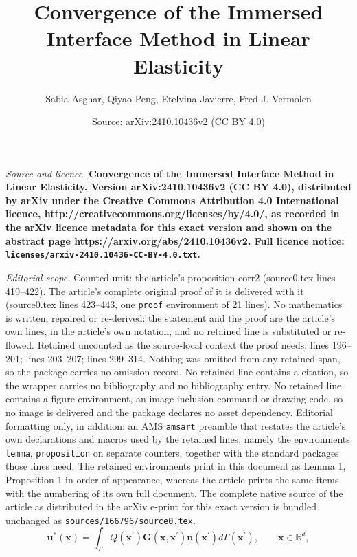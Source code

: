 \documentclass[10pt,a4paper]{amsart}
\title{\bf Convergence of the Immersed Interface Method in Linear Elasticity}
\author{Sabia Asghar, Qiyao Peng, Etelvina Javierre, Fred J. Vermolen}
\date{Source: arXiv:2410.10436v2 (CC BY 4.0)}
\begin{document}
\maketitle

\noindent\emph{Source and licence.} \bf Convergence of the Immersed Interface Method in Linear Elasticity. Version arXiv:2410.10436v2 (CC BY 4.0), distributed by arXiv under the Creative Commons Attribution 4.0 International licence, http://creativecommons.org/licenses/by/4.0/, as recorded in the arXiv licence metadata for this exact version and shown on the abstract page https://arxiv.org/abs/2410.10436v2. Full licence notice: \texttt{licenses/arxiv-2410.10436-CC-BY-4.0.txt}.\par\smallskip

\noindent\textit{Editorial scope.} Counted unit: the article's proposition corr2 (source0.tex lines 419--422). The article's complete original proof of it is delivered with it (source0.tex lines 423--443, one \texttt{proof} environment of 21 lines). No mathematics is written, repaired or re-derived: the statement and the proof are the article's own lines, in the article's own notation, and no retained line is substituted or re-flowed.  Retained uncounted as the source-local context the proof needs: lines 196--201; lines 203--207; lines 299--314.  Nothing was omitted from any retained span, so the package carries no omission record.  No retained line contains a citation, so the wrapper carries no bibliography and no bibliography entry.  No retained line contains a figure environment, an image-inclusion command or drawing code, so no image is delivered and the package declares no asset dependency.  Editorial formatting only, in addition: an AMS \texttt{amsart} preamble that restates the article's own declarations and macros used by the retained lines, namely the environments \texttt{lemma}, \texttt{proposition} on separate counters, together with the standard packages those lines need.  The retained environments print in this document as Lemma 1, Proposition 1 in order of appearance, whereas the article prints the same items with the numbering of its own full document.  The complete native source of the article as distributed in the arXiv e-print for this exact version is bundled unchanged as \texttt{sources/166796/source0.tex}.
\begin{equation}
\boldsymbol{u}^{\ast }(\boldsymbol{x})=\int_{\Gamma }Q(\boldsymbol{x}%
^{\prime })\boldsymbol{G}(\boldsymbol{x},\boldsymbol{x}^{\prime })%
\boldsymbol{n}(\boldsymbol{x}^{\prime })d\Gamma (\boldsymbol{x}^{\prime
}), \qquad {\boldsymbol x} \in \mathbb{R}^d,  \label{eq:u_star}
\end{equation}
\end{document}
